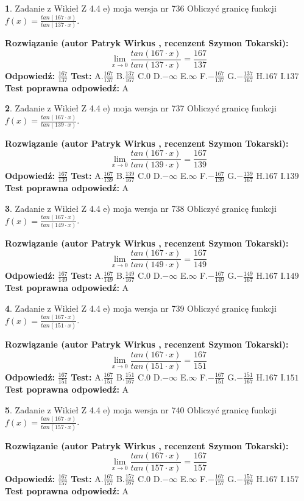 \documentclass[12pt, a4paper]{article}
\theoremstyle{definition} %
\newtheorem{zad}{}
\newcommand{\zadStart}[1]{\begin{zad}#1\newline}
\newcommand{\zadStop}{\end{zad}}
\newcommand{\rozwStart}[2]{\noindent \textbf{Rozwiązanie (autor #1 , recenzent #2): }\newline}
\newcommand{\rozwStop}{\newline}
\newcommand{\odpStart}{\noindent \textbf{Odpowiedź:}\newline}
\newcommand{\odpStop}{\newline}
\newcommand{\testStart}{\noindent \textbf{Test:}\newline}
\newcommand{\testStop}{\newline}
\newcommand{\kluczStart}{\noindent \textbf{Test poprawna odpowiedź:}\newline}
\newcommand{\kluczStop}{\newline}
\begin{document}
\zadStart{Zadanie z Wikieł Z 4.4 e) moja wersja nr 736}
Obliczyć granicę funkcji $f(x)=\frac{tan(167\cdot x)}{tan(137\cdot x)}$.
\zadStop
\rozwStart{Patryk Wirkus}{Szymon Tokarski}
$$\lim\limits_{x\to 0}\frac{tan(167\cdot x)}{tan(137\cdot x)}=
\frac{167}{137}$$
\rozwStop
\odpStart
$\frac{167}{137}$
\odpStop
\testStart
A.$\frac{167}{137}$
B.$\frac{137}{167}$
C.$0$
D.$-\infty$
E.$\infty$
F.$-\frac{167}{137}$
G.$-\frac{137}{167}$
H.$167$
I.$137$
\testStop
\kluczStart
A
\kluczStop



\zadStart{Zadanie z Wikieł Z 4.4 e) moja wersja nr 737}
Obliczyć granicę funkcji $f(x)=\frac{tan(167\cdot x)}{tan(139\cdot x)}$.
\zadStop
\rozwStart{Patryk Wirkus}{Szymon Tokarski}
$$\lim\limits_{x\to 0}\frac{tan(167\cdot x)}{tan(139\cdot x)}=
\frac{167}{139}$$
\rozwStop
\odpStart
$\frac{167}{139}$
\odpStop
\testStart
A.$\frac{167}{139}$
B.$\frac{139}{167}$
C.$0$
D.$-\infty$
E.$\infty$
F.$-\frac{167}{139}$
G.$-\frac{139}{167}$
H.$167$
I.$139$
\testStop
\kluczStart
A
\kluczStop



\zadStart{Zadanie z Wikieł Z 4.4 e) moja wersja nr 738}
Obliczyć granicę funkcji $f(x)=\frac{tan(167\cdot x)}{tan(149\cdot x)}$.
\zadStop
\rozwStart{Patryk Wirkus}{Szymon Tokarski}
$$\lim\limits_{x\to 0}\frac{tan(167\cdot x)}{tan(149\cdot x)}=
\frac{167}{149}$$
\rozwStop
\odpStart
$\frac{167}{149}$
\odpStop
\testStart
A.$\frac{167}{149}$
B.$\frac{149}{167}$
C.$0$
D.$-\infty$
E.$\infty$
F.$-\frac{167}{149}$
G.$-\frac{149}{167}$
H.$167$
I.$149$
\testStop
\kluczStart
A
\kluczStop



\zadStart{Zadanie z Wikieł Z 4.4 e) moja wersja nr 739}
Obliczyć granicę funkcji $f(x)=\frac{tan(167\cdot x)}{tan(151\cdot x)}$.
\zadStop
\rozwStart{Patryk Wirkus}{Szymon Tokarski}
$$\lim\limits_{x\to 0}\frac{tan(167\cdot x)}{tan(151\cdot x)}=
\frac{167}{151}$$
\rozwStop
\odpStart
$\frac{167}{151}$
\odpStop
\testStart
A.$\frac{167}{151}$
B.$\frac{151}{167}$
C.$0$
D.$-\infty$
E.$\infty$
F.$-\frac{167}{151}$
G.$-\frac{151}{167}$
H.$167$
I.$151$
\testStop
\kluczStart
A
\kluczStop



\zadStart{Zadanie z Wikieł Z 4.4 e) moja wersja nr 740}
Obliczyć granicę funkcji $f(x)=\frac{tan(167\cdot x)}{tan(157\cdot x)}$.
\zadStop
\rozwStart{Patryk Wirkus}{Szymon Tokarski}
$$\lim\limits_{x\to 0}\frac{tan(167\cdot x)}{tan(157\cdot x)}=
\frac{167}{157}$$
\rozwStop
\odpStart
$\frac{167}{157}$
\odpStop
\testStart
A.$\frac{167}{157}$
B.$\frac{157}{167}$
C.$0$
D.$-\infty$
E.$\infty$
F.$-\frac{167}{157}$
G.$-\frac{157}{167}$
H.$167$
I.$157$
\testStop
\kluczStart
A
\kluczStop
\end{document}
